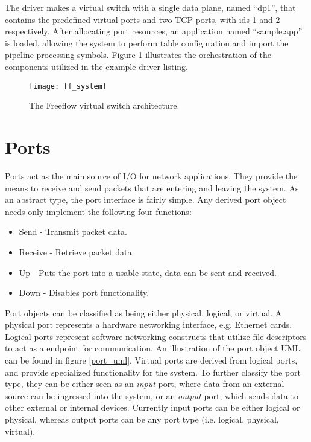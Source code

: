 The driver makes a virtual switch with a single data plane, named ``dp1'', that
contains the predefined virtual ports and two TCP ports, with ids 1 and 2
respectively. After allocating port resources, an application named
``sample.app'' is loaded, allowing the system to perform table configuration
and import the pipeline processing symbols. Figure \ref{ff_system} illustrates
the orchestration of the components utilized in the example driver listing.

\begin{figure}[h]
\centering
\texttt{[image: ff\_system]}
\caption{The Freeflow virtual switch architecture.}
\label{ff_system}
\end{figure}

\section{Ports}
\label{vm:port}
Ports act as the main source of I/O for network applications. They provide the
means to receive and send packets that are entering and leaving the system. As
an abstract type, the port interface is fairly simple. Any derived port object
needs only implement the following four functions:

\begin{itemize}
\item Send - Transmit packet data.
\item Receive - Retrieve packet data.
\item Up - Puts the port into a usable state, data can be sent and received.
\item Down - Disables port functionality.
\end{itemize}

Port objects can be classified as being either physical, logical, or virtual. A
physical port represents a hardware networking interface, e.g. Ethernet cards.
Logical ports represent software networking constructs that utilize file
descriptors to act as a endpoint for communication. An illustration of the port
object UML can be found in figure \ref{port_uml}. Virtual ports are derived
from logical ports, and provide specialized functionality for the system. To
further classify the port type, they can be either seen as an \emph{input}
port, where data from an external source can be ingressed into the system, or an
\emph{output} port, which sends data to other external or internal devices.
Currently input ports can be either logical or physical, whereas output ports
can be any port type (i.e. logical, physical, virtual).

